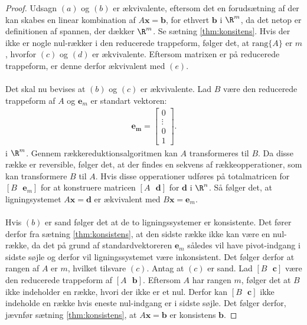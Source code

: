 \begin{proof}
%
Udsagn $(a)$ og $(b)$ er ækvivalente, eftersom det en forudsætning af der kan skabes en linear kombination af $A\mathbf{x} =\mathbf{b}$, for ethvert $\mathbf{b}$ i $\R^m$, da det netop er definitionen af spannen, der dækker $\R^m$.
Se sætning \ref{thm:konsitens}.
%
Hvis der ikke er nogle nul-rækker i den reducerede trappeform, følger det, at $\text{rang}\{A\}$ er $m$, hvorfor $(c)$ og $(d)$ er ækvivalente. 
Eftersom matrixen er på reducerede trappeform, er denne derfor ækvivalent med $(e)$.
\\\\
Det skal nu bevises at $(b)$ og $(c)$ er ækvivalente. 
Lad $B$ være den reducerede trappeform af $A$ og $\mathbf{e}_m$ er standart vektoren:
%
\begin{align*}
\mathbf{\mathbf{e}_m} = \begin{bmatrix}
		0 \\
        \vdots \\
        0 \\
        1 
\end{bmatrix}.
\end{align*}
%
i $\R^m$. 
Gennem rækkereduktionsalgoritmen kan $A$ transformeres til $B$. 
Da disse række er reversible, følger det, at der findes en sekvens af rækkeopperationer, som kan transformere $B$ til $A$.
Hvis disse opperationer udføres på totalmatricen for 
$[B \text{    } \mathbf{e}_m]$ 
for at konstruere matricen 
$[A \text{    } \mathbf{d}]$ 
for $\mathbf{d}$ i $\R^n$. 
Så følger det, at ligningsystemet $A\mathbf{x}=\mathbf{
d}$ er ækvivalent med $B\mathbf{x}=\mathbf{e}_m$.
\\\\
Hvis $(b)$ er sand følger det at de to ligningssystemer er konsistente. 
Det fører derfor fra sætning \ref{thm:konsistens}, at den sidste række ikke kan være en nul-række, da det på grund af standardvektoreren $\mathbf{e}_m$ således vil have pivot-indgang i sidste søjle og derfor vil ligningssystemet være inkonsistent.
Det følger derfor at rangen af $A$ er $m$, hvilket tilsvare $(c)$.
Antag at $(c)$ er sand. 
Lad $[B \text{    } \mathbf{c}]$ 
være den reducerede trappeform af 
$[A \text{    } \mathbf{b}]$.
Eftersom $A$ har rangen $m$, følger det at $B$ ikke indeholder en række, hvori der ikke er et nul.  
Derfor kan $[B \text{    } \mathbf{c}]$ ikke indeholde en række hvis eneste nul-indgang er i sidste søjle. 
Det følger derfor, jævnfør sætning \ref{thm:konsistens}, at $A\mathbf{x}=\mathbf{b}$ er konsistens $\mathbf{b}$.
%
\end{proof}
